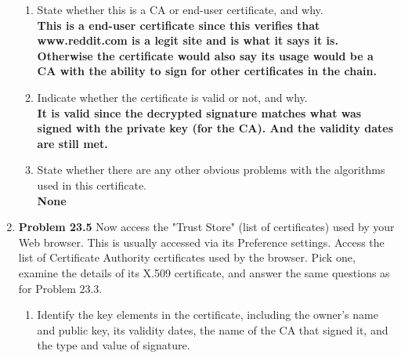 \documentclass[12pt]{article}
\begin{document}
\begin{enumerate}
\begin{enumerate}
    \item State whether this is a CA or end-user certificate, and why. \\

    \textbf{This is a end-user certificate since this verifies that www.reddit.com is a legit site and is what it says it is. Otherwise the certificate would also say its usage would be a CA with the ability to sign for other certificates in the chain.} \\

    \item Indicate whether the certificate is valid or not, and why. \\

    \textbf{It is valid since the decrypted signature matches what was signed with the private key (for the CA). And the validity dates are still met.} \\

    \item State whether there are any other obvious problems with the algorithms used in this certificate. \\

    \textbf{None} \\

  \end{enumerate}

  \item \textbf{Problem 23.5} Now access the "Trust Store" (list of certificates) used by your Web browser. This is usually accessed via its Preference settings. Access the list of Certificate Authority certificates used by the browser. Pick one, examine the details of its X.509 certificate, and answer the same questions as for Problem 23.3. \\

  \begin{enumerate}
    \item Identify the key elements in the certificate, including the owner's name and public key, its validity dates, the name of the CA that signed it, and the type and value of signature. \\


\end{enumerate}
\end{enumerate}
\end{document}
